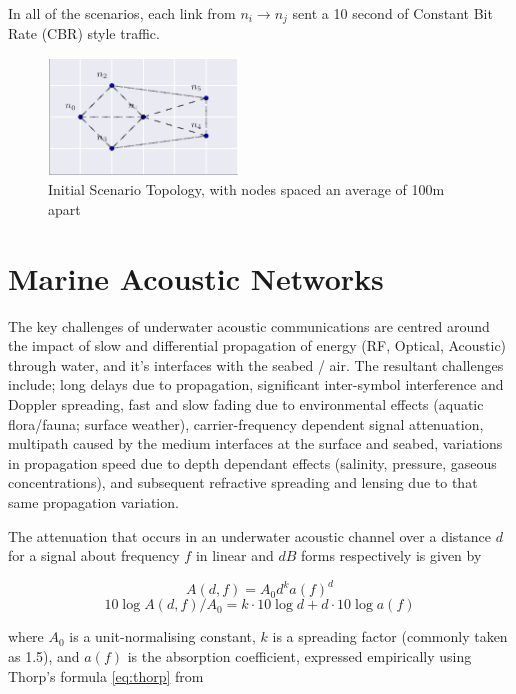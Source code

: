\documentclass[runningheads,a4paper]{llncs}
\begin{document}
In all of the scenarios, each link from $n_i \rightarrow n_j$ sent a 10 second of Constant Bit Rate (CBR) style traffic.

\begin{figure}[h]
  \centering
  \includegraphics[width=0.45\textwidth]{img/s1_layout.pdf}
  \caption{Initial Scenario Topology, with nodes spaced an average of 100m apart}
  \label{fig:s1_layout}
\end{figure}

\section{Marine Acoustic Networks}\label{sec:marineacousticnetworks}

The key challenges of underwater acoustic communications are centred around the impact of slow and differential propagation of energy (RF, Optical, Acoustic) through water, and it's interfaces with the seabed / air.
The resultant challenges include; long delays due to propagation, significant inter-symbol interference and Doppler spreading, fast and slow fading due to environmental effects (aquatic flora/fauna; surface weather), carrier-frequency dependent signal attenuation, multipath caused by the medium interfaces at the surface and seabed, variations in propagation speed due to depth dependant effects (salinity, pressure, gaseous concentrations), and subsequent refractive spreading and lensing due to that same propagation variation. 

The attenuation that occurs in an underwater acoustic channel over a distance $d$ for a signal about frequency $f$ in linear and $dB$ forms respectively is given by

\begin{equation}
  \label{eq:acoattenuation}
  A(d,f) = A_0d^ka(f)^d
\end{equation}
\begin{equation}
  \label{eq:acoattenuationdb}
  10 \log A(d,f)/A_0 = k \cdot 10 \log d + d \cdot 10 \log a(f)
\end{equation}

where $A_0$ is a unit-normalising constant, $k$ is a spreading factor (commonly taken as 1.5), and $a(f)$ is the absorption coefficient, expressed empirically using Thorp's formula \eqref{eq:thorp} from \cite{Stojanovic2007}
\end{document}
